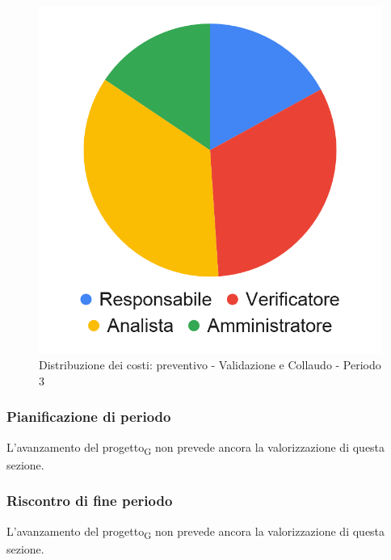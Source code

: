 \hspace{-1cm}
\begin{minipage}{.50\textwidth}
\smallPreventivoTable{
	
}
\end{minipage}
\hspace{1cm}
\begin{minipage}{.40\textwidth}
\begin{figure}[H]
	\includegraphics[scale=0.21]{res/images/charts/preventivo_priori/Grafico4-12.png}
	\caption{Distribuzione dei costi: preventivo - Validazione e Collaudo - Periodo 3}
\end{figure}
\end{minipage} 


\subsubsection{Pianificazione di periodo}


L'avanzamento del progetto\textsubscript{G} non prevede ancora la valorizzazione di questa sezione.



\subsubsection{Riscontro di fine periodo}


L'avanzamento del progetto\textsubscript{G} non prevede ancora la valorizzazione di questa sezione.
